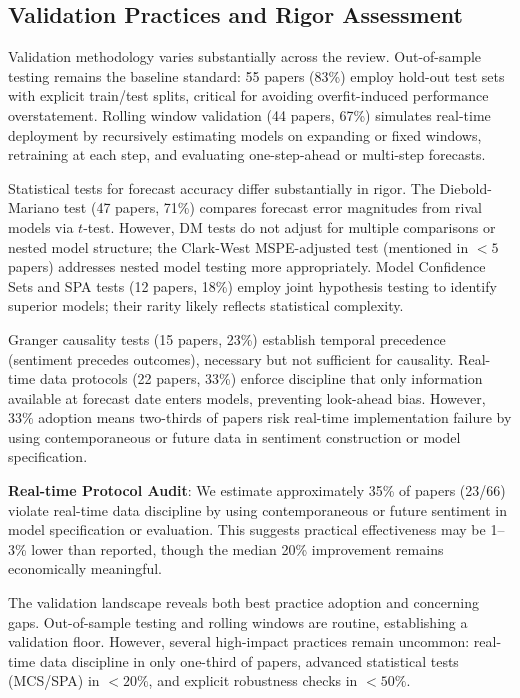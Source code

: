 \documentclass[11pt,twocolumn]{article}
\begin{document}
\subsection{Validation Practices and Rigor Assessment}

Validation methodology varies substantially across the review. Out-of-sample testing remains the baseline standard: 55 papers (83\%) employ hold-out test sets with explicit train/test splits, critical for avoiding overfit-induced performance overstatement. Rolling window validation (44 papers, 67\%) simulates real-time deployment by recursively estimating models on expanding or fixed windows, retraining at each step, and evaluating one-step-ahead or multi-step forecasts.

Statistical tests for forecast accuracy differ substantially in rigor. The Diebold-Mariano test (47 papers, 71\%) compares forecast error magnitudes from rival models via $t$-test. However, DM tests do not adjust for multiple comparisons or nested model structure; the Clark-West MSPE-adjusted test (mentioned in $<5$ papers) addresses nested model testing more appropriately. Model Confidence Sets and SPA tests (12 papers, 18\%) employ joint hypothesis testing to identify superior models; their rarity likely reflects statistical complexity.

Granger causality tests (15 papers, 23\%) establish temporal precedence (sentiment precedes outcomes), necessary but not sufficient for causality. Real-time data protocols (22 papers, 33\%) enforce discipline that only information available at forecast date enters models, preventing look-ahead bias. However, 33\% adoption means two-thirds of papers risk real-time implementation failure by using contemporaneous or future data in sentiment construction or model specification.



\footnotesize \textbf{Real-time Protocol Audit}: We estimate approximately 35\% of papers (23/66) violate real-time data discipline by using contemporaneous or future sentiment in model specification or evaluation. This suggests practical effectiveness may be 1--3\% lower than reported, though the median 20\% improvement remains economically meaningful.\normalsize

\normalsize The validation landscape reveals both best practice adoption and concerning gaps. Out-of-sample testing and rolling windows are routine, establishing a validation floor. However, several high-impact practices remain uncommon: real-time data discipline in only one-third of papers, advanced statistical tests (MCS/SPA) in $<20\%$, and explicit robustness checks in $<50\%$.
\end{document}
